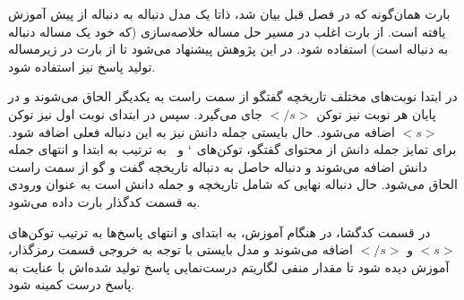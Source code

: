 بارت همان‌گونه که در فصل قبل بیان شد، ذاتا یک مدل دنباله به دنباله از پیش آموزش یافته است. از بارت اغلب در مسیر حل مساله خلاصه‌سازی (که خود یک مساله دنباله به دنباله است) استفاده شود. در این پژوهش پیشنهاد می‌شود تا از بارت در زیرمساله تولید پاسخ نیز استفاده شود. 

در ابتدا نوبت‌های مختلف تاریخچه گفتگو از سمت راست به یکدیگر الحاق می‌شوند و در پایان هر نوبت نیز توکن
$</s>$
جای می‌گیرد. سپس در ابتدای نوبت اول نیز توکن
$<s>$
اضافه می‌شود. حال بایستی جمله دانش نیز به این دنباله فعلی اضافه شود. برای تمایز جمله دانش از محتوای گفتگو، توکن‌های 
$`$
و
$~$
به ترتیب به ابتدا و انتهای جمله دانش اضافه می‌شوند و دنباله حاصل به دنباله تاریخچه گفت و گو از سمت راست الحاق می‌شود. حال دنباله نهایی که شامل تاریخچه و جمله دانش است به عنوان ورودی به قسمت کدگذار بارت داده می‌شود. 

در قسمت کدگشا، در هنگام آموزش، به ابتدای و انتهای پاسخ‌ها به ترتیب توکن‌های 
$<s>$
و
$</s>$
اضافه می‌شوند و مدل بایستی با توجه به خروجی قسمت رمزگذار، آموزش دیده شود تا مقدار منفی لگاریتم درست‌نمایی پاسخ‌ تولید شده‌اش با عنایت به پاسخ درست کمینه شود.

